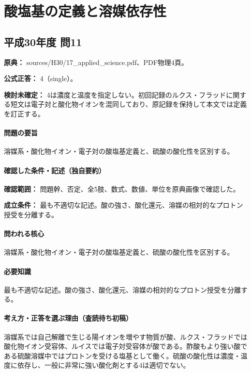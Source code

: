 \section{酸塩基の定義と溶媒依存性}

\subsection{平成30年度 問11}
\label{q:h30-reg-applied-11}

\noindent\textbf{原典：} sources/H30/17\_applied\_science.pdf、PDF物理4頁。

\textbf{公式正答：} 4（single）。

\par\textbf{検討未確定：} 4は濃度と温度を指定しない。初回記録のルクス・フラッドに関する短文は電子対と酸化物イオンを混同しており、原記録を保持して本文では定義を訂正する。

\paragraph{問題の要旨} 溶媒系・酸化物イオン・電子対の酸塩基定義と、硫酸の酸化性を区別する。

\paragraph{確認した条件・記述（独自要約）}\mbox{}\par

\noindent\textbf{確認範囲：} 問題幹、否定、全5肢、数式、数値、単位を原典画像で確認した。\par

\noindent\textbf{成立条件：} 最も不適切な記述。酸の強さ、酸化還元、溶媒の相対的なプロトン授受を分離する。\par

\paragraph{問われる核心} 溶媒系・酸化物イオン・電子対の酸塩基定義と、硫酸の酸化性を区別する。

\paragraph{必要知識} 最も不適切な記述。酸の強さ、酸化還元、溶媒の相対的なプロトン授受を分離する。

\paragraph{考え方・正答を選ぶ理由（査読待ち初稿）} 溶媒系では自己解離で生じる陽イオンを増やす物質が酸、ルクス・フラッドでは酸化物イオン受容体、ルイスでは電子対受容体が酸である。酢酸もより強い酸である硫酸溶媒中ではプロトンを受ける塩基として働く。硫酸の酸化性は濃度・温度に依存し、一般に非常に強い酸化剤とする4は適切でない。

